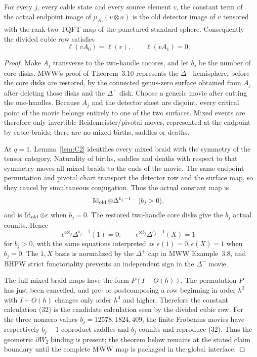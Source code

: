 \begin{lemma}\label{lem:Sendpoint}
For every \(j\), every cable state and every source element \(v\), the
constant term of the actual endpoint image of
\(\mu_{A_j}(v\otimes a)\) is the old detector image of \(v\) tensored with
the rank-two TQFT map of the punctured standard sphere.  Consequently the
divided cubic row satisfies
\[
\ell(vA_0)=\ell(v),\qquad \ell(vA_1)=0.
\]
\end{lemma}

\begin{proof}
Make \(A_j\) transverse to the two-handle cocores, and let \(b_j\) be the
number of core disks.  MWW's proof of Theorem~3.10 represents the
\(\Delta^-\) hemisphere, before the core disks are restored, by the connected
genus-zero surface obtained from \(A_j\) after deleting those disks and the
\(\Delta^+\) disk.  Choose a generic movie after cutting the one-handles.
Because \(A_j\) and the detector sheet are disjoint, every critical point of
the movie belongs entirely to one of the two surfaces.  Mixed events are
therefore only invertible Reidemeister/pivotal moves, represented at the
endpoint by cable braids; there are no mixed births, saddles or deaths.

At \(q=1\), Lemma~\ref{lem:C2} identifies every mixed braid with the
symmetry of the tensor category.  Naturality of births, saddles and deaths
with respect to that symmetry moves all mixed braids to the ends of the
movie.  The same endpoint permutation and pivotal chart transport the
detector row and the surface map, so they cancel by simultaneous
conjugation.  Thus the actual constant map is
\[
\operatorname{Id}_{\rm old}\otimes\Delta^{b_j-1}\quad(b_j>0),
\]
and is \(\operatorname{Id}_{\rm old}\otimes\epsilon\) when \(b_j=0\).
The restored two-handle core disks give the \(b_j\) actual counits.  Hence
\[
\epsilon^{\otimes b_j}\Delta^{b_j-1}(1)=0,\qquad
\epsilon^{\otimes b_j}\Delta^{b_j-1}(X)=1
\tag{32}
\]
for \(b_j>0\), with the same equations interpreted as
\(\epsilon(1)=0,\epsilon(X)=1\) when \(b_j=0\).
The \(1,X\) basis is normalized by the \(\Delta^+\) cap in MWW
Example~3.8, and BHPW strict functoriality prevents an independent sign in
the \(\Delta^-\) movie.

The full mixed braid maps have the form \(P(I+O(h))\).  The permutation
\(P\) has just been cancelled, and pre- or postcomposing a row beginning in
order \(h^3\) with \(I+O(h)\) changes only order \(h^4\) and higher.
Therefore the constant calculation (32) is the candidate calculation seen by
the divided cubic row.  For the three nonzero values
$b_j=12578,1824,409$, the finite Frobenius movies have respectively
$b_j-1$ coproduct saddles and $b_j$ counits and reproduce (32).  Thus the
geometric $\partial W_2$ binding is present; the theorem below remains at the
stated claim boundary until the complete MWW map is packaged in the global
interface.
\end{proof}

